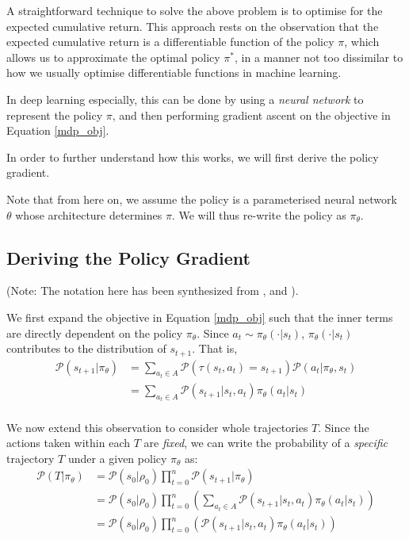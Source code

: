 \documentclass{article} %
\begin{document}
A straightforward technique to solve the above problem is to optimise for the expected cumulative return.
This approach rests on the observation that the expected cumulative return is a differentiable function of the policy $\pi$,
which allows us to approximate the optimal policy $\pi^*$, in a manner not too dissimilar to how we usually
optimise differentiable functions in machine learning.

In deep learning especially, this can be done by using a \textit{neural network} to represent the policy $\pi$,
and then performing gradient ascent on the objective in Equation \eqref{mdp_obj}.

In order to further understand how this works, we will first derive the policy gradient.

Note that from here on, we assume the policy is a parameterised neural network $\theta$ whose architecture determines $\pi$.
We will thus re-write the policy as $\pi_\theta$. 


\subsection{Deriving the Policy Gradient}
(Note: The notation here has been synthesized from \cite{SpinningUp-2018}, \cite{Levine-et-al-2023} and \cite{Weng-2018}).

We first expand the objective in Equation \eqref{mdp_obj}
such that the inner terms are directly dependent on the policy $\pi_\theta$.
Since $a_t \sim \pi_\theta(\cdot | s_t)$, $\pi_\theta(\cdot | s_t)$ contributes to the distribution of $s_{t + 1}$.
That is,
\begin{equation} \label{prob_state}
    \begin{aligned}
        \mathcal{P}(s_{t + 1} | \pi_\theta) & = \sum_{a_t \in A} \mathcal{P}(\tau(s_t, a_t) = s_{t + 1}) \mathcal{P}(a_t | \pi_\theta, s_t) \\
                                            & = \sum_{a_t \in A} \mathcal{P}(s_{t + 1} | s_t, a_t) \pi_\theta(a_t | s_t) \\
    \end{aligned}
\end{equation}

We now extend this observation to consider whole trajectories $T$. Since the actions taken within each $T$ are \textit{fixed},
we can write the probability of a \textit{specific} trajectory $T$ under a given policy $\pi_\theta$ as:
\begin{equation} \label{prob_traj}
    \begin{aligned}
        \mathcal{P}(T | \pi_\theta) & = \mathcal{P}(s_0 | \rho_0) \prod_{t=0}^{n} \mathcal{P}(s_{t + 1} | \pi_\theta) \\
                                    & = \mathcal{P}(s_0 | \rho_0) \prod_{t=0}^{n} \left( \sum_{a_t \in A} \mathcal{P}(s_{t + 1} | s_t, a_t) \pi_\theta(a_t | s_t) \right) \\
                                    & = \mathcal{P}(s_0 | \rho_0) \prod_{t=0}^{n} \left(\mathcal{P}(s_{t + 1} | s_t, a_t) \pi_\theta(a_t | s_t) \right) \\
    \end{aligned}
\end{equation}
\end{document}
